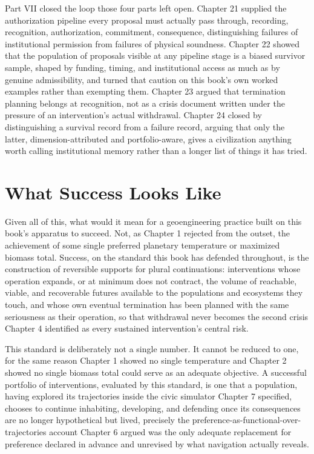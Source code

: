 \documentclass[11pt,oneside]{book}
\begin{document}
Part VII closed the loop those four parts left open. Chapter 21 supplied the authorization pipeline every proposal must actually pass through, recording, recognition, authorization, commitment, consequence, distinguishing failures of institutional permission from failures of physical soundness. Chapter 22 showed that the population of proposals visible at any pipeline stage is a biased survivor sample, shaped by funding, timing, and institutional access as much as by genuine admissibility, and turned that caution on this book's own worked examples rather than exempting them. Chapter 23 argued that termination planning belongs at recognition, not as a crisis document written under the pressure of an intervention's actual withdrawal. Chapter 24 closed by distinguishing a survival record from a failure record, arguing that only the latter, dimension-attributed and portfolio-aware, gives a civilization anything worth calling institutional memory rather than a longer list of things it has tried.

\section*{What Success Looks Like}

Given all of this, what would it mean for a geoengineering practice built on this book's apparatus to succeed. Not, as Chapter 1 rejected from the outset, the achievement of some single preferred planetary temperature or maximized biomass total. Success, on the standard this book has defended throughout, is the construction of reversible supports for plural continuations: interventions whose operation expands, or at minimum does not contract, the volume of reachable, viable, and recoverable futures available to the populations and ecosystems they touch, and whose own eventual termination has been planned with the same seriousness as their operation, so that withdrawal never becomes the second crisis Chapter 4 identified as every sustained intervention's central risk.

This standard is deliberately not a single number. It cannot be reduced to one, for the same reason Chapter 1 showed no single temperature and Chapter 2 showed no single biomass total could serve as an adequate objective. A successful portfolio of interventions, evaluated by this standard, is one that a population, having explored its trajectories inside the civic simulator Chapter 7 specified, chooses to continue inhabiting, developing, and defending once its consequences are no longer hypothetical but lived, precisely the preference-as-functional-over-trajectories account Chapter 6 argued was the only adequate replacement for preference declared in advance and unrevised by what navigation actually reveals.
\end{document}
